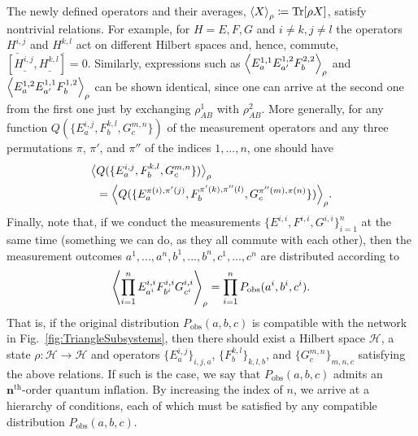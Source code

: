 \documentclass[superscriptaddress,aps,prx,nofootinbib,twocolumn,twoside,reprint,letterpaper,longbibliography]{revtex4-2}
\newcommand{\term}[1]{\textcolor{medblue}{\textbf{#1}}}
\DeclarePairedDelimiter{\expec}{\langle}{\rangle}
\DeclarePairedDelimiter{\braks}{\lbrack}{\rbrack}
\DeclareMathOperator{\Tr}{Tr}
\begin{document}
The newly defined operators and their averages, ${\left< X \right>_\rho \coloneqq \Tr\braks{\rho X}}$, satisfy nontrivial relations.
For example, for ${H=E,F,G}$ and ${i\not=k, j\not=l}$ the operators $H^{i,j}_{\_}$ and $H^{k,l}_{\_}$ act on different Hilbert spaces and, hence, commute, \mbox{$\left[H^{i,j}_{\_},H^{k,l}_{\_} \right]=0$}.
Similarly, expressions such as ${\expec*{ E^{1,1}_a E^{1,2}_{a'}F^{2,2}_b}_\rho}$ and ${\expec*{ E^{1,2}_aE^{1,1}_{a'}F^{1,2}_b}_\rho}$ can be shown identical, since one can arrive at the second one from the first one just by exchanging $\rho_{AB}^1$ with $\rho_{AB}^2$.
More generally, for any function ${Q(\{E^{i,j}_a,F^{k,l}_b,G^{m,n}_c\})}$ of the measurement operators and any three permutations $\pi$, $\pi'$, and $\pi''$ of the indices ${1,...,n}$, one should have
\begin{align}\begin{split}
  \big\langle &Q(\{E^{i,j}_a,F^{k,l}_b,G^{m,n}_c\})\big\rangle_\rho\\
  &=\expec*{ Q(\{E^{\pi(i),\pi'(j)}_a,F^{\pi'(k),\pi''(l)}_b,G^{\pi''(m),\pi(n)}_c\})}_\rho.
  \label{permut}
\end{split}\end{align}
Finally, note that, if we conduct the measurements $\{E^{i,i},F^{i,i}, G^{i,i}\}_{i=1}^n$ at the same time (something we can do, as they all commute with each other), then the measurement outcomes ${a^1,...,a^n,b^1,..., b^n,c^1,...,c^n}$ are distributed according to
\begin{align}
  \expec*{\prod_{i=1}^nE^{i,i}_{a^i}F^{i,i}_{b^i}G^{i,i}_{c^i}}_\rho =\prod_{i=1}^n P_\text{obs}(a^i,b^i,c^i).
  \label{stat}
\end{align}
That is, if the original distribution $P_\text{obs}(a,b,c)$ is compatible with the network in Fig.~\ref{fig:TriangleSubsystems}, then there should exist a Hilbert space $\mathcal{H}$, a state $\rho: \mathcal{H}\to \mathcal{H}$ and operators $\{E^{i,j}_a\}_{i,j,a}$, $\{F^{k,l}_b\}_{k,l,b}$, and $\{G^{m,n}_c\}_{m,n,c}$ satisfying the above relations.
If such is the case, we say that $P_\text{obs}(a,b,c)$ admits an \term{${\boldsymbol{n}^\text{th}\text{-order quantum inflation}}$}.
By increasing the index of $n$, we arrive at a hierarchy of conditions, each of which must be satisfied by any compatible distribution $P_\text{obs}(a,b,c)$.
\end{document}

